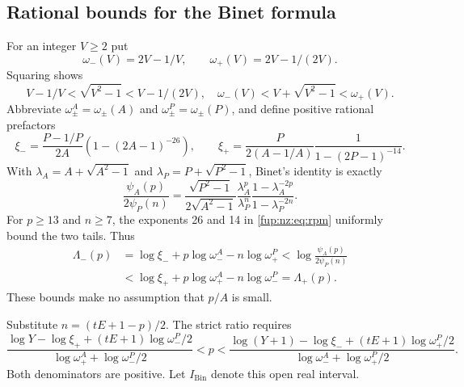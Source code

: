 \documentclass[11pt,letterpaper]{article}
\theoremstyle{definition}\newtheorem{definition}[theorem]{Definition}
\theoremstyle{remark}\newtheorem{remark}[theorem]{Remark}
\begin{document}
\subsection{Rational bounds for the Binet formula}
For an integer $V\ge2$ put
\[
 \omega_-(V)=2V-1/V,\qquad \omega_+(V)=2V-1/(2V).
\]
Squaring shows
\[
 V-1/V<\sqrt{V^2-1}<V-1/(2V),\quad
 \omega_-(V)<V+\sqrt{V^2-1}<\omega_+(V).
\]
Abbreviate $\omega^A_\pm=\omega_\pm(A)$ and $\omega^P_\pm=\omega_\pm(P)$, and define positive rational prefactors
\begin{equation}\label{fup:nz:eq:rpm}
 \xi_- =\frac{P-1/P}{2A}\left(1-(2A-1)^{-26}\right),\qquad
 \xi_+ =\frac{P}{2(A-1/A)}\frac1{1-(2P-1)^{-14}}.
\end{equation}
With $\lambda_A=A+\sqrt{A^2-1}$ and $\lambda_P=P+\sqrt{P^2-1}$, Binet's identity is exactly
\[
 \frac{\psi_A(p)}{2\psi_P(n)}=
 \frac{\sqrt{P^2-1}}{2\sqrt{A^2-1}}
 \frac{\lambda_A^p}{\lambda_P^n}
 \frac{1-\lambda_A^{-2p}}{1-\lambda_P^{-2n}}.
\]
For $p\ge13$ and $n\ge7$, the exponents 26 and 14 in \eqref{fup:nz:eq:rpm} uniformly bound the two tails. Thus
\begin{align}\label{fup:nz:eq:LU}
 \Lambda_-(p)&=\log \xi_-+p\log \omega^A_- -n\log \omega^P_+
 <\log\frac{\psi_A(p)}{2\psi_P(n)}\nonumber\\
 &<\log \xi_++p\log \omega^A_+-n\log \omega^P_-=\Lambda_+(p).
\end{align}
These bounds make no assumption that $p/A$ is small.

Substitute $n=(tE+1-p)/2$. The strict ratio requires
\begin{equation}\label{fup:nz:eq:logwindow}
 \frac{\log Y-\log \xi_+ +(tE+1)\log \omega^P_-/2}
 {\log \omega^A_+ +\log \omega^P_-/2}
 <p<
 \frac{\log(Y+1)-\log \xi_- +(tE+1)\log \omega^P_+/2}
 {\log \omega^A_- +\log \omega^P_+/2}.
\end{equation}
Both denominators are positive. Let $I_{\mathrm{Bin}}$ denote this open real interval.
\end{document}
